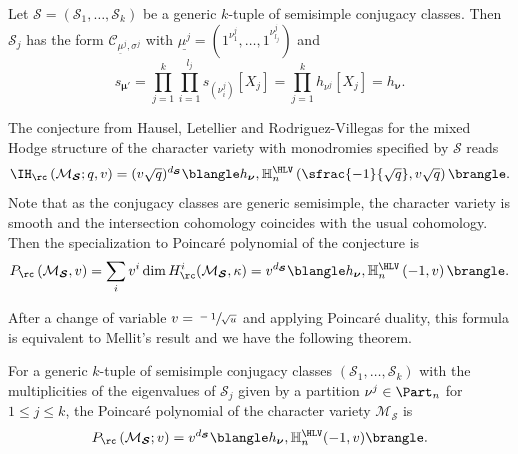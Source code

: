 Let $\boldsymbol{\mathcal{S}}=(\mathcal{S}_1,\dots,\mathcal{S}_k)$ be a generic $k$-tuple of semisimple conjugacy classes. Then $\mathcal{S}_j$ has the form $\mathcal{C}_{\underline{\mu}^j,\sigma^j}$ with
$\underline{\mu^j}=(1^{\nu^j_1},\dots,1^{\nu^j_{l_j}})$ and
\[
s_{\boldsymbol{\mu'}} = \prod_{j=1}^k\prod_{i=1}^{l_j} s_{(\nu^j_i)}[X_j] = \prod_{j=1}^k h_{\nu^j}[X_j] = h_{\boldsymbol{\nu}}.
\]

The conjecture from Hausel, Letellier and Rodriguez-Villegas \cite{Hausel_Letellier_Villegas} for the mixed Hodge structure of the character variety with monodromies specified by $\boldsymbol{\mathcal{S}}$ reads
\[
\IH_{\rc} \left(\mathcal{M}_{\boldsymbol{\mathcal{S}}};q,v\right) = (v \sqrt{q})^{d_{\boldsymbol{\mathcal{S}}}}\blangle h_{\boldsymbol{\nu}}, \mathbb{H}_n^{\HLV}\left(\sfrac{-1}{\sqrt{q}},v\sqrt{q}\right)\brangle.
\]
Note that as the conjugacy classes are generic semisimple, the character variety is smooth and the intersection cohomology coincides with the usual cohomology. Then the specialization to Poincaré polynomial of the conjecture is
\begin{equation}\label{eq_poincare_ss}
P_{\rc}\left(\mathcal{M}_{\boldsymbol{\mathcal{S}}}, v\right) = \sum_{i} v^i \dim H_\rc^i(\mathcal{M}_{\boldsymbol{\mathcal{S}}},\kappa) = v^{d_{\boldsymbol{\mathcal{S}}}}\blangle h_{\boldsymbol{\nu}}, \mathbb{H}^{\HLV}_n\left(-1,v\right)\brangle.
\end{equation}

After a change of variable $v=\sfrac{-1}{\sqrt{u}}$ and applying Poincaré duality, this formula is equivalent to Mellit's result \cite[Th.\,7.12]{Mellit2020} and we have the following theorem.
\begin{theorem}\label{th_mellit}
For a generic $k$-tuple of semisimple conjugacy classes $\left(\mathcal{S}_1,\dots,\mathcal{S}_k\right)$ with the multiplicities of the eigenvalues of $\mathcal{S}_j$ given by a partition $\nu^j\in \Part_n$ for $1\le j \le k$, the Poincaré polynomial of the character variety $\mathcal{M}_{\boldsymbol{\mathcal{S}}}$ is
\begin{equation}\label{eq_poincare_mellit}
P_{\rc} \left(\mathcal{M}_{\boldsymbol{\mathcal{S}}}; v\right) = v^{d_{\boldsymbol{\mathcal{S}}}}\blangle h_{\boldsymbol{\nu}}, \mathbb{H}_n^{\HLV}(-1,v)\brangle.
\end{equation}
\end{theorem}

